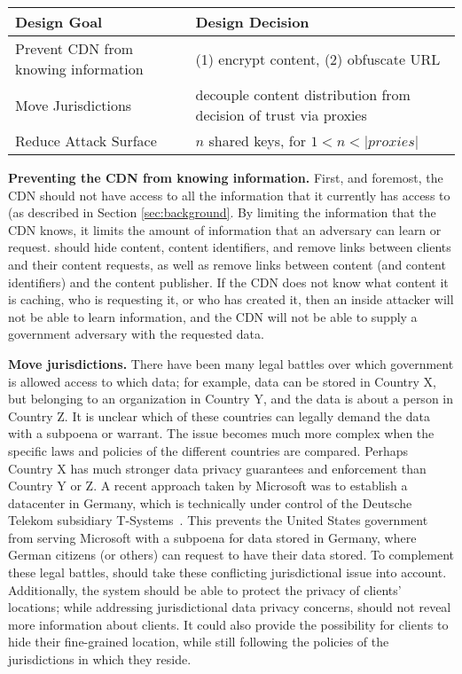 \begin{table*}[h]
\centering
\begin{tabular}{| l | l |} 
 \hline
 {\bf Design Goal} & {\bf Design Decision} \\ 
 \hline\hline
 Prevent CDN from knowing information & (1) encrypt content, (2) obfuscate URL  \\ \hline
 Move Jurisdictions & decouple content distribution from decision of trust via proxies  \\ \hline
 Reduce Attack Surface & $n$ shared keys, for $1 < n < |proxies|$ \\ 
 \hline
\end{tabular}
\caption{Design goals and the corresponding design choices made in \system{}.}
\label{tab:design_goals}
\end{table*}

{\bf Preventing the CDN from knowing information.} First, and foremost, the CDN 
should not have access to all the information that it currently has access to (as described 
in Section \ref{sec:background}.  By limiting the information that the CDN knows, it limits 
the amount of information that an adversary can learn or request.  \system{} should hide 
content, content identifiers, and remove links between clients and their content requests, as well 
as remove links between content (and content identifiers) and the content publisher.  If the CDN 
does not know what content it is caching, who is requesting it, or who has created it, then an 
inside attacker will not be able to learn information, and the CDN will not be able to supply 
a government adversary with the requested data.

{\bf Move jurisdictions.} There have been many legal battles over which government is allowed access 
to which data; for example, data can be stored in Country X, but belonging to an organization in Country Y, and 
the data is about a person in Country Z.  It is unclear which of these countries can legally demand 
the data with a subpoena or warrant.  The issue becomes much more complex when the specific laws 
and policies of the different countries are compared.  Perhaps Country X has much stronger data privacy 
guarantees and enforcement than Country Y or Z.  A recent approach taken by Microsoft was to establish 
a datacenter in Germany, which is technically under control of the Deutsche Telekom subsidiary 
T-Systems~\cite{microsoft_germany}.  This prevents the United States government from serving Microsoft with a subpoena 
for data stored in Germany, where German citizens (or others) can request to have their data stored.
  To complement these legal battles, \system{} should take 
these conflicting jurisdictional issue into account.  Additionally, the system should be able to protect 
the privacy of clients' locations; while addressing jurisdictional data privacy concerns, \system{} 
should not reveal more information about clients.  It could also provide the possibility for clients 
to hide their fine-grained location, while still following the policies of the jurisdictions in which 
they reside.

